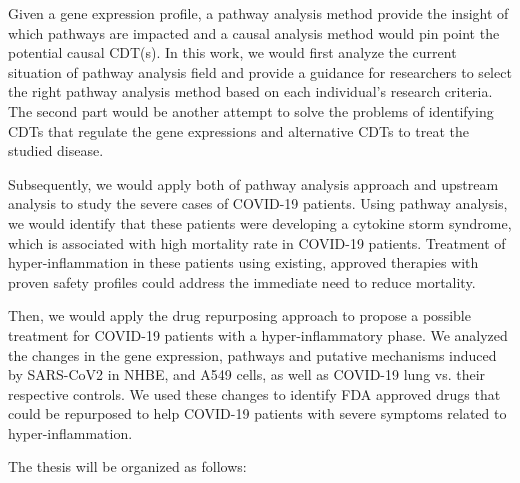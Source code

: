 %

Given a gene expression profile, a pathway analysis method provide the insight of which pathways are impacted and a causal analysis method would pin point the potential causal CDT(s).
In this work, we would first analyze the current situation of pathway analysis field and provide a guidance for  researchers to select the right pathway analysis method based on each individual's research criteria. The second part would be another attempt to solve the problems of identifying CDTs that regulate the gene expressions and alternative CDTs to treat the studied disease. 

Subsequently, we would apply both of pathway analysis approach and upstream analysis to study the severe cases of COVID-19 patients. Using pathway analysis, we would identify that these patients were developing a cytokine storm syndrome, which is associated with high mortality rate in COVID-19 patients. Treatment of hyper-inflammation in these patients using existing, approved therapies with proven safety profiles could address the immediate need to reduce   mortality. 

Then, we would apply the drug repurposing approach to propose a possible treatment for COVID-19 patients with a hyper-inflammatory phase. 
We analyzed  the changes in the gene expression, pathways and putative mechanisms induced by SARS-CoV2 in  NHBE, and A549 cells, as well as COVID-19 lung vs. their respective controls. We used these  changes to identify FDA approved drugs that could be repurposed to help COVID-19 patients with severe symptoms related to hyper-inflammation. 

The thesis will be organized as follows:

